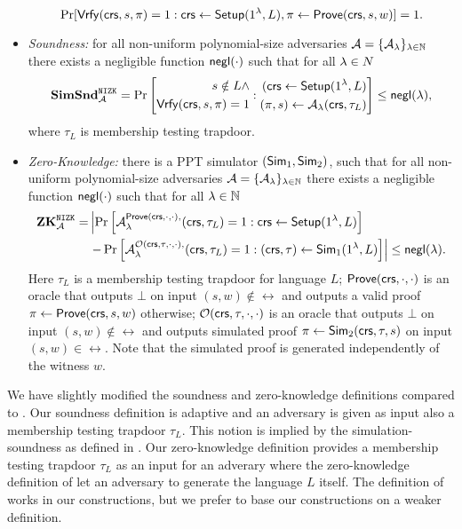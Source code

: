 \begin{definition}
\begin{itemize}
\[\Pr[\mathsf{Vrfy}(\mathsf{crs}, s,\pi)=1:\mathsf{crs} \leftarrow \mathsf{Setup}(1{^{\lambda}}, L), \pi \leftarrow \mathsf{Prove}(\mathsf{crs}, s,w)] =1.\] 
\item \emph{Soundness:} for all non-uniform polynomial-size adversaries $\mathcal{A} = \{\mathcal{A}_{\lambda}\}_{\lambda \in \mathbb{N}}$ there exists a negligible function $\mathsf{negl}(\cdot)$ such that for all $\lambda \in N$
\[
\mathbf{SimSnd}_{\mathcal{A}}^{\mathtt{NIZK}} = \Pr\left[
\begin{aligned}
s \notin L \land \\
\mathsf{Vrfy}(\mathsf{crs}, s, \pi) = 1
\end{aligned}
:
\begin{aligned}
(\mathsf{crs} \leftarrow \mathsf{Setup}(1{^{\lambda}}, L) \\
(\pi, s) \leftarrow \mathcal{A}_{\lambda}(\mathsf{crs}, \tau_L)
\end{aligned} \right] \leq \mathsf{negl}(\lambda),
\]
where $\tau_L$ is membership testing trapdoor. 
\item \emph{Zero-Knowledge:} there is a PPT simulator $(\mathsf{Sim}_1, \mathsf{Sim}_2)$, such that for all non-uniform polynomial-size adversaries $\mathcal{A} = \{\mathcal{A}_{\lambda}\}_{\lambda \in \mathbb{N}}$ there exists a negligible function $\mathsf{negl}(\cdot)$ such that for all $\lambda \in \mathbb{N}$ 
\begin{align*}
\mathbf{ZK}_{\mathcal{A}}^{\mathtt{NIZK}} =& 
\left| \Pr\left[ \mathcal{A}_{\lambda}^{\mathsf{Prove}(\mathsf{crs}, \cdot, \cdot),}(\mathsf{crs}, \tau_L) = 1:\mathsf{crs} \leftarrow \mathsf{Setup}(1{^{\lambda}}, L) \right] \right. \\
&\left. - \Pr\left[ \mathcal{A}_{\lambda}^{\mathcal{O}(\mathsf{crs}, \tau, \cdot, \cdot),}(\mathsf{crs}, \tau_L) = 1: (\mathsf{crs}, \tau) \leftarrow \mathsf{Sim}_1(1{^{\lambda}}, L) \right] \right|
\leq \mathsf{negl}(\lambda).
\end{align*}
Here $\tau_L$ is a membership testing trapdoor for language $L$; $\mathsf{Prove}(\mathsf{crs}, \cdot, \cdot)$ is an oracle that outputs $\bot$ on input $(s,w) \notin \rel$ and outputs a valid proof $\pi \leftarrow \mathsf{Prove}(\mathsf{crs}, s, w)$ otherwise; $\mathcal{O}(\mathsf{crs}, \tau, \cdot, \cdot)$ is an oracle that outputs $\bot$ on input $(s,w) \notin \rel$ and outputs simulated proof $\pi \leftarrow \mathsf{Sim}_2(\mathsf{crs}, \tau, s)$ on input $(s,w) \in \rel$. Note that the simulated proof is generated independently of the witness $w$.
\end{itemize}

\end{definition}

\begin{remark} 
We have slightly modified the soundness and zero-knowledge definitions compared to \cite{Libert2021OneShotFN}. Our soundness definition is adaptive and an adversary is given as input also a membership testing trapdoor $\tau_L$. This notion is implied by the simulation-soundness as defined in . Our zero-knowledge definition provides a membership testing trapdoor $\tau_L$ as an input for an adverary where the zero-knowledge definition of \cite{Libert2021OneShotFN} let an adversary to generate the language $L$ itself. The definition of \cite{Libert2021OneShotFN} works in our constructions, but we prefer to base our constructions on a weaker definition. 
\end{remark}

